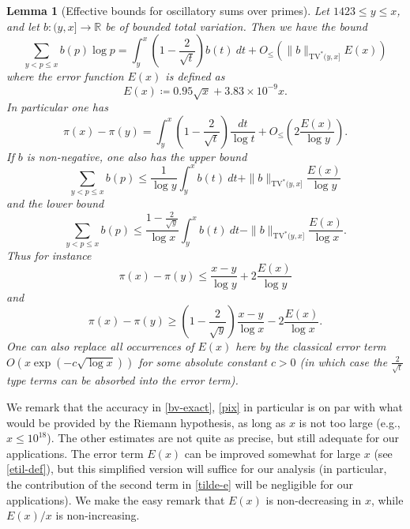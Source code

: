 \documentclass[12pt,a4paper,reqno]{amsart}
\numberwithin{equation}{section}
\theoremstyle{plain}
\newtheorem{lemma}[theorem]{Lemma}
\theoremstyle{definition}
\newcommand\R{\mathbb{R}}
\begin{document}
\begin{lemma}[Effective bounds for oscillatory sums over primes]\label{osc-lemma}  Let $1423 \leq y \leq x$, and let $b: (y,x] \to \R$ be of bounded total variation.  Then we have the bound
\begin{equation}\label{bv-exact}
    \sum_{y < p \leq x} b(p) \log p = \int_y^x \left(1-\frac{2}{\sqrt{t}}\right) b(t)\ dt + O_{\leq}(\|b\|_{\mathrm{TV}^*(y,x]} E(x))
\end{equation}
where the error function $E(x)$ is defined as
\begin{equation}\label{tilde-e}
  E(x) \coloneqq 0.95 \sqrt{x} + 3.83 \times 10^{-9} x.
\end{equation}
In particular one has
\begin{equation}\label{pix}
  \pi(x) - \pi(y) = \int_y^x \left(1-\frac{2}{\sqrt{t}}\right)\frac{dt}{\log t} + O_\leq\left(2 \frac{E(x)}{\log y}\right).
\end{equation}
If $b$ is non-negative, one also has the upper bound
\begin{equation}\label{bv-upper}
   \sum_{y < p \leq x} b(p) \leq \frac{1}{\log y} \int_y^x b(t)\ dt + \|b\|_{\mathrm{TV}^*(y,x]} \frac{E(x)}{\log y}
\end{equation}
and the lower bound
\begin{equation}\label{bv-lower}
  \sum_{y < p \leq x} b(p) \leq \frac{1-\frac{2}{\sqrt{y}}}{\log x} \int_y^x b(t)\ dt - \|b\|_{\mathrm{TV}^*(y,x]} \frac{E(x)}{\log x}.
\end{equation}
Thus for instance
\begin{equation}\label{pixy-upper}
 \pi(x) - \pi(y) \leq \frac{x-y}{\log y} + 2 \frac{E(x)}{\log y}
\end{equation}
and
\begin{equation}\label{pixy-lower}
  \pi(x) - \pi(y) \geq \left(1-\frac{2}{\sqrt{y}}\right) \frac{x-y}{\log x} - 2 \frac{E(x)}{\log x}.
\end{equation}
One can also replace all occurrences of $E(x)$ here by the classical error term $O(x \exp(-c \sqrt{\log x}))$ for some absolute constant $c>0$ (in which case the $\frac{2}{\sqrt{t}}$ type terms can be absorbed into the error term).
\end{lemma}

We remark that the accuracy in \eqref{bv-exact}, \eqref{pix} in particular is on par with what would be provided by the Riemann hypothesis, as long as $x$ is not too large (e.g., $x \leq 10^{18}$).  The other estimates are not quite as precise, but still adequate for our applications.  The error term $E(x)$ can be improved somewhat for large $x$ (see \eqref{etil-def}), but this simplified version will suffice for our analysis (in particular, the contribution of the second term in \eqref{tilde-e} will be negligible for our applications).  We make the easy remark that $E(x)$ is non-decreasing in $x$, while $E(x)/x$ is non-increasing.
\end{document}
